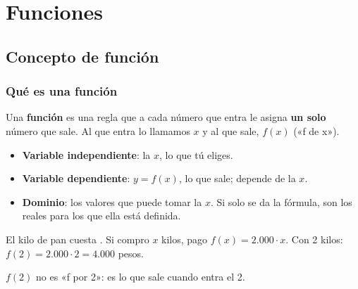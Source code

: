 \chapter{Funciones}

\section{Concepto de función}

\subsection{Qué es una función}
Una \textbf{función} es una regla que a cada número que entra le asigna \textbf{un solo} número que sale. Al que entra lo llamamos $x$ y al que sale, $f(x)$ («f de x»).
\begin{itemize}
  \item \textbf{Variable independiente}: la $x$, lo que tú eliges.
  \item \textbf{Variable dependiente}: $y = f(x)$, lo que sale; depende de la $x$.
  \item \textbf{Dominio}: los valores que puede tomar la $x$. Si solo se da la fórmula, son los reales para los que ella está definida.
\end{itemize}
\begin{ejemplo} El kilo de pan cuesta . Si compro $x$ kilos, pago $f(x) = 2.000\cdot x$. Con 2 kilos: $f(2) = 2.000\cdot 2 = 4.000$ pesos.\end{ejemplo}
\begin{ojo} $f(2)$ no es «f por 2»: es lo que sale cuando entra el 2.\end{ojo}

